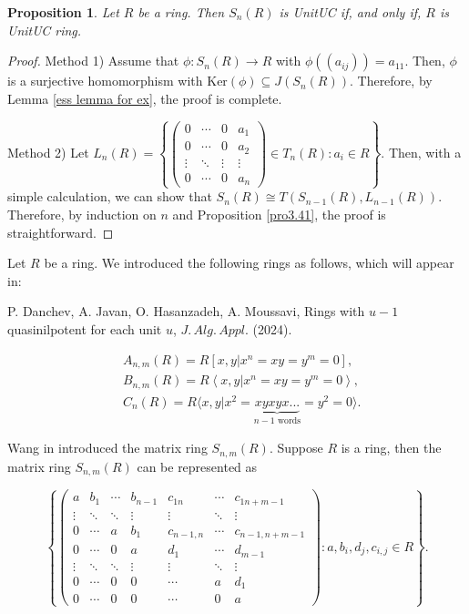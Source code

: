 \documentclass[12pt]{amsart}
\newtheorem{proposition}[theorem]{Proposition}
\theoremstyle{definition}
\begin{document}
\begin{proposition}
    Let $R$ be a ring. Then $S_n(R)$ is   UnitUC if, and only if, $R$ is   UnitUC ring.
\end{proposition}
\begin{proof}
Method 1) Assume that $\phi: S_n(R)\longrightarrow  R$ with $\phi((a_{ij}))=a_{11}$. Then, $\phi$ is a surjective homomorphism with $\text{Ker}(\phi) \subseteq J(S_n(R))$. Therefore, by Lemma \ref{ess lemma for ex}, the proof is complete.

Method 2) Let $L_n(R) = \left\{
\begin{pmatrix}
    0 & \cdots & 0 & a_1 \\ 0 & \cdots & 0 & a_2 \\ \vdots & \ddots & \vdots & \vdots \\ 0 & \cdots & 0 & a_n  
\end{pmatrix}
\in T_n(R) : a_i \in R \right \}$. Then, with a simple calculation, we can show that $S_n(R) \cong T(S_{n-1}(R), L_{n-1}(R))$. Therefore, by induction on $n$ and Proposition \ref{pro3.41}, the proof is straightforward.
\end{proof}

Let $R$ be a ring. We introduced  the following rings as follows,  which will appear in: \par
P. Danchev, A. Javan, O. Hasanzadeh, A. Moussavi,  Rings with $u-1$ quasinilpotent for each unit $u$, $J.\, Alg.\, Appl.$ (2024).


\begin{align*} 
&A_{n,m}(R) =R[x,y | x^n=xy=y^m=0], \\
&B_{n,m}(R) =R\left\langle x,y | x^n=xy=y^m=0  \right\rangle, \\
&C_{n}(R) =R \langle x,y | x^2=\underbrace{xyxyx...}_{\text{$n-1$ words}}=y^2=0 \rangle.
\end{align*}

Wang in \cite{wang} introduced the matrix ring $S_{n,m}(R)$. Suppose $R$ is a ring, then the matrix ring $S_{n,m}(R)$ can be represented as

$$\left\{ \begin{pmatrix}
   a & b_1 & \cdots & b_{n-1} & c_{1n} & \cdots & c_{1 n+m-1}\\
   \vdots  & \ddots & \ddots & \vdots & \vdots & \ddots & \vdots \\
   0 & \cdots & a & b_1 & c_{n-1,n} & \cdots & c_{n-1,n+m-1} \\
   0 & \cdots & 0 & a & d_1 & \cdots & d_{m-1} \\
   \vdots  & \ddots & \ddots & \vdots & \vdots & \ddots & \vdots \\
   0 & \cdots & 0 & 0  & \cdots & a & d_1 \\
   0 & \cdots & 0 & 0  & \cdots & 0 & a
\end{pmatrix}  : a, b_i, d_j,c_{i,j} \in R \right\}.$$
\end{document}
